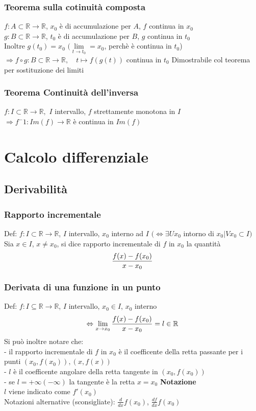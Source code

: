 \documentclass{article}
\begin{document}
\subsubsection{Teorema sulla cotinuità composta}
$f: A \subset \mathbb{R} \to \mathbb{R}$, $x_0$ è di accumulazione per $A$, $f$ continua in $x_0$\\
$g:  B \subset \mathbb{R} \to \mathbb{R}$, $t_0$ è di accumulazione per $B$, $g$ continua in $t_0$\\
Inoltre $g(t_0) = x_0$ $(\lim\limits_{t \to t_0} = x_0$, perchè è continua in $t_0$)\\
$\Rightarrow f \circ g: B \subset \mathbb{R} \to \mathbb{R}, \quad t \longmapsto f(g(t))$ continua in $t_0$
\bigbreak
\noindent Dimostrabile col teorema per sostituzione dei limiti

\subsubsection{Teorema Continuità dell'inversa}
$f: I \subset \mathbb{R} \to \mathbb{R},$ $I$ intervallo, $f$ strettamente monotona in $I$\\
$\Rightarrow f^-1: Im(f) \to \mathbb{R}$ è continua in $Im(f)$ 


\section{Calcolo differenziale}
\subsection{Derivabilità}
\subsubsection{Rapporto incrementale}
Def: $f: I \subset \mathbb{R} \to \mathbb{R}$, $I$ intervallo, $x_0$ interno ad $I$ $(\Leftrightarrow \exists Ux_0$ intorno di $x_0| Vx_0 \subset I)$\\
Sia $x \in I$, $x \neq x_0$, si dice rapporto incrementale di $f$ in $x_0$ la quantità 
\[\scalebox{1}{$\displaystyle\frac{f(x)-f(x_0)}{x-x_0}$}\]

\subsubsection{Derivata di una funzione in un punto}
Def: $f: I \subseteq \mathbb{R} \to \mathbb{R}$, $I$ intervallo, $x_0 \in I$, $x_0$ interno
\[\scalebox{1}{$\displaystyle\Leftrightarrow \lim\limits_{x \to x_0}\frac{f(x)-f(x_0)}{x-x_0}$} = l \in \mathbb{R}\]
Si può inoltre notare che:\\ 
- il rapporto incrementale di $f$ in $x_0$ è il coefficente della retta passante per i punti $(x_0, f(x_0)),(x, f(x))$\\
- $l$ è il coefficente angolare della retta tangente in $(x_0, f(x_0))$\\ 
- se $l=+\infty(-\infty)$ la tangente è la retta $x = x_0$
\bigbreak
\noindent\textbf{Notazione}\\
$l$ viene indicato come $f'(x_0)$\\
Notazioni alternative (sconsigliate): $\frac{d}{dx}f(x_0)$, $\frac{df}{dx}f(x_0)$
\end{document}
